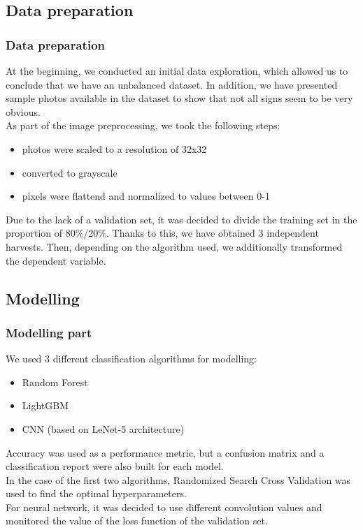 \documentclass[8pt]{beamer}
\begin{document}
\subsection{Data preparation}
\begin{frame}
\frametitle{Data preparation}
At the beginning, we conducted an initial data exploration, which allowed us to conclude that we have an unbalanced dataset. In addition, we have presented sample photos available in the dataset to show that not all signs seem to be very obvious.\\
\vspace{2mm}
As part of the image preprocessing, we took the following steps:
\begin{itemize}
    \item<1-> photos were scaled to a resolution of 32x32
    \item<1-> converted to grayscale
    \item<1-> pixels were flattend and normalized to values between 0-1 
\end{itemize}
\vspace{2mm}
Due to the lack of a validation set, it was decided to divide the training set in the proportion of 80\%/20\%. Thanks to this, we have obtained 3 independent harvests.
Then, depending on the algorithm used, we additionally transformed the dependent variable.
\end{frame}

\subsection{Modelling}
\begin{frame}
\frametitle{Modelling part}
We used 3 different classification algorithms for modelling:
\begin{itemize}
    \item<1-> Random Forest
    \item<1-> LightGBM
    \item<1-> CNN (based on LeNet-5 architecture)
\end{itemize}

Accuracy was used as a performance metric, but a confusion matrix and a classification report were also built for each model.\\
\vspace{2mm}
In the case of the first two algorithms, Randomized Search Cross Validation was used to find the optimal hyperparameters.\\
\vspace{2mm}
For neural network, it was decided to use different convolution values and monitored the value of the loss function of the validation set.
\end{frame}
\end{document}
